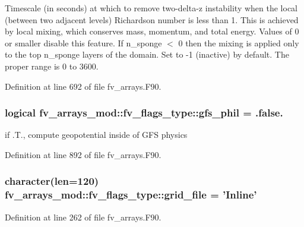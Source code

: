 Timescale (in seconds) at which to remove two-\/delta-\/z instability when the local (between two adjacent levels) Richardson number is less than 1. This is achieved by local mixing, which conserves mass, momentum, and total energy. Values of 0 or smaller disable this feature. If n\-\_\-sponge $<$ 0 then the mixing is applied only to the top n\-\_\-sponge layers of the domain. Set to -\/1 (inactive) by default. The proper range is 0 to 3600. 



Definition at line 692 of file fv\-\_\-arrays.\-F90.

\subsubsection[{gfs\-\_\-phil}]{\setlength{\rightskip}{0pt plus 5cm}logical fv\-\_\-arrays\-\_\-mod\-::fv\-\_\-flags\-\_\-type\-::gfs\-\_\-phil = .false.}\label{structfv__arrays__mod_1_1fv__flags__type_aa47220672025f2e6cb029aefcc9c466d}


if .T., compute geopotential inside of G\-F\-S physics 



Definition at line 892 of file fv\-\_\-arrays.\-F90.

\subsubsection[{grid\-\_\-file}]{\setlength{\rightskip}{0pt plus 5cm}character(len=120) fv\-\_\-arrays\-\_\-mod\-::fv\-\_\-flags\-\_\-type\-::grid\-\_\-file = 'Inline'}\label{structfv__arrays__mod_1_1fv__flags__type_a5ae6853512fe75e5f08388470d4f0da6}


Definition at line 262 of file fv\-\_\-arrays.\-F90.

